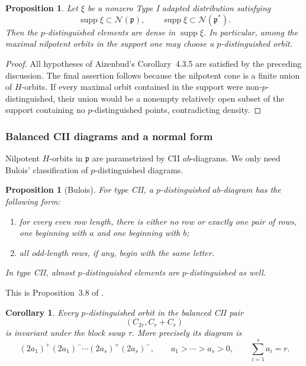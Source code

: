 \documentclass[11pt,reqno]{amsart}
\numberwithin{equation}{section}
\newtheorem{proposition}[theorem]{Proposition}
\newtheorem{corollary}[theorem]{Corollary}
\theoremstyle{definition}
\theoremstyle{remark}
\newcommand{\supp}{\operatorname{supp}}
\newcommand{\cN}{\mathcal N}
\begin{document}
\begin{proposition}\label{cii:prop:dense-distinguished}
Let \(\xi\) be a nonzero Type I adapted distribution satisfying
\[
\supp\xi\subset\cN(\mathfrak p),
\qquad
\supp\widehat{\xi}\subset\cN(\mathfrak p^*).
\]
Then the \(p\)-distinguished elements are dense in \(\supp\xi\).
In particular, among the maximal nilpotent orbits in the support one may
choose a \(p\)-distinguished orbit.
\end{proposition}

\begin{proof}
All hypotheses of Aizenbud's Corollary~4.3.5 are satisfied by the preceding
discussion.  The final assertion follows because the nilpotent cone is a
finite union of \(H\)-orbits.  If every maximal orbit contained in the
support were non-\(p\)-distinguished, their union would be a nonempty
relatively open subset of the support containing no \(p\)-distinguished
points, contradicting density.
\end{proof}

\subsubsection{Balanced CII diagrams and a normal form}

Nilpotent \(H\)-orbits in \(\mathfrak p\) are parametrized by CII
\(ab\)-diagrams.  We only need Bulois' classification of
\(p\)-distinguished diagrams.

\begin{proposition}[Bulois]\label{cii:prop:bulois}
For type CII, a \(p\)-distinguished \(ab\)-diagram has the following form:
\begin{enumerate}[label=(\roman*)]
\item for every even row length, there is either no row or exactly one
pair of rows, one beginning with \(a\) and one beginning with \(b\);
\item all odd-length rows, if any, begin with the same letter.
\end{enumerate}
In type CII, almost \(p\)-distinguished elements are \(p\)-distinguished as well.
\end{proposition}

This is Proposition~3.8 of \cite{Bulois}.

\begin{corollary}\label{cii:cor:stable-distinguished}
Every \(p\)-distinguished orbit in the balanced CII pair
\[
(C_{2r},C_r+C_r)
\]
is invariant under the block swap \(\tau\).  More precisely its diagram is
\[
(2a_1)^+(2a_1)^-\cdots
(2a_s)^+(2a_s)^-,
\qquad
a_1>\cdots>a_s>0,
\qquad
\sum_{i=1}^s a_i=r.
\]
\end{corollary}
\end{document}
